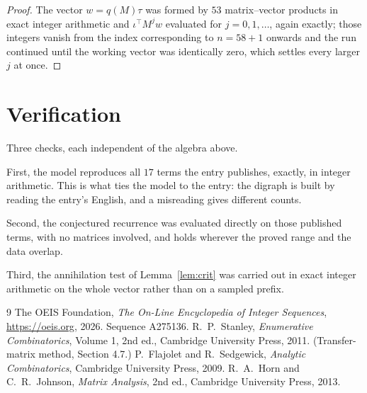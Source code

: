 \documentclass[11pt,a4paper]{article}
\theoremstyle{plain}
\theoremstyle{definition}
\begin{document}
\begin{proof}
The vector $w=q(M)\tau$ was formed by $53$ matrix--vector products in exact integer
arithmetic and $\iota^{\!\top}M^{j}w$ evaluated for $j=0,1,\dots$, again exactly; those
integers vanish from the index corresponding to $n=58+1$ onwards and the run continued
until the working vector was identically zero, which settles every larger $j$ at once.
\end{proof}

\section{Verification}

Three checks, each independent of the algebra above.

First, the model reproduces all $17$ terms the entry publishes, exactly, in integer
arithmetic. This is what ties the model to the entry: the digraph is built by reading the
entry's English, and a misreading gives different counts.

Second, the conjectured recurrence was evaluated directly on those published terms, with no
matrices involved, and holds wherever the proved range and the data overlap.

Third, the annihilation test of Lemma~\ref{lem:crit} was carried out in exact integer
arithmetic on the whole vector rather than on a sampled prefix.

\begin{thebibliography}{9}
 The OEIS Foundation, \emph{The On-Line Encyclopedia of Integer
Sequences}, \url{https://oeis.org}, 2026. Sequence A275136.
 R.~P.~Stanley, \emph{Enumerative Combinatorics}, Volume 1, 2nd ed.,
Cambridge University Press, 2011. (Transfer-matrix method, Section 4.7.)
 P.~Flajolet and R.~Sedgewick, \emph{Analytic Combinatorics}, Cambridge
University Press, 2009.
 R.~A.~Horn and C.~R.~Johnson, \emph{Matrix Analysis}, 2nd ed., Cambridge
University Press, 2013.
\end{thebibliography}
\end{document}
